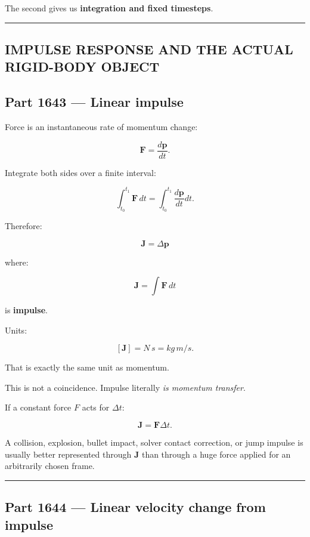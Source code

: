 The second gives us \textbf{integration and fixed timesteps}.

\begin{center}\rule{0.5\linewidth}{0.5pt}\end{center}

\subsection{IMPULSE RESPONSE AND THE ACTUAL RIGID-BODY OBJECT}\label{06-engine-ii-ch036-impulse-response-and-the-actual-rigid-body-object}

\subsection{Part 1643 --- Linear impulse}\label{06-engine-ii-ch036-part-1643-linear-impulse}

Force is an instantaneous rate of momentum change:

\[
\mathbf F=\frac{d\mathbf p}{dt}.
\]

Integrate both sides over a finite interval:

\[
\int_{t_0}^{t_1}\mathbf F\,dt
=
\int_{t_0}^{t_1}\frac{d\mathbf p}{dt}dt.
\]

Therefore:

\[
\boxed{
\mathbf J
=
\Delta\mathbf p
}
\]

where:

\[
\boxed{
\mathbf J
=
\int\mathbf F\,dt
}
\]

is \textbf{impulse}.

Units:

\[
[\mathbf J]
=
N\,s
=
kg\,m/s.
\]

That is exactly the same unit as momentum.

This is not a coincidence. Impulse literally \emph{is momentum transfer}.

If a constant force \(F\) acts for \(\Delta t\):

\[
\mathbf J
=
\mathbf F\Delta t.
\]

A collision, explosion, bullet impact, solver contact correction, or jump impulse is usually better represented through \(\mathbf J\) than through a huge force applied for an arbitrarily chosen frame.

\begin{center}\rule{0.5\linewidth}{0.5pt}\end{center}

\subsection{Part 1644 --- Linear velocity change from impulse}\label{06-engine-ii-ch036-part-1644-linear-velocity-change-from-impulse}

